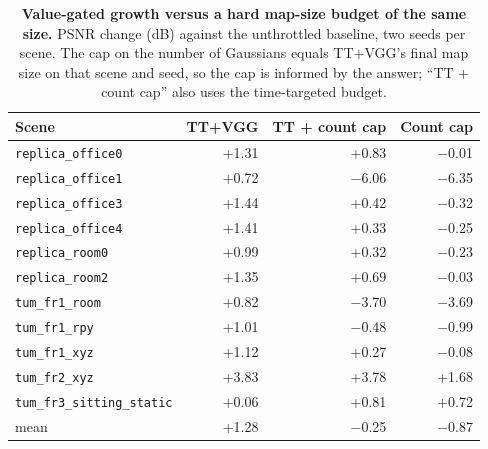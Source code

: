 \begin{table}[tbp]
\centering
\footnotesize\setlength{\tabcolsep}{4pt}
\begin{tabular}{lrrr}
\toprule
\textbf{Scene} & \textbf{TT+VGG} & \textbf{TT + count cap} & \textbf{Count cap} \\
\midrule
\texttt{replica\_office0} & +1.31 & +0.83 & $-$0.01 \\
\texttt{replica\_office1} & +0.72 & $-$6.06 & $-$6.35 \\
\texttt{replica\_office3} & +1.44 & +0.42 & $-$0.32 \\
\texttt{replica\_office4} & +1.41 & +0.33 & $-$0.25 \\
\texttt{replica\_room0} & +0.99 & +0.32 & $-$0.23 \\
\texttt{replica\_room2} & +1.35 & +0.69 & $-$0.03 \\
\texttt{tum\_fr1\_room} & +0.82 & $-$3.70 & $-$3.69 \\
\texttt{tum\_fr1\_rpy} & +1.01 & $-$0.48 & $-$0.99 \\
\texttt{tum\_fr1\_xyz} & +1.12 & +0.27 & $-$0.08 \\
\texttt{tum\_fr2\_xyz} & +3.83 & +3.78 & +1.68 \\
\texttt{tum\_fr3\_sitting\_static} & +0.06 & +0.81 & +0.72 \\
\midrule
mean & +1.28 & $-$0.25 & $-$0.87 \\
\bottomrule
\end{tabular}
\caption{\textbf{Value-gated growth versus a hard map-size budget of the same size.} PSNR change (dB) against the unthrottled baseline, two seeds per scene. The cap on the number of Gaussians equals TT+VGG's final map size on that scene and seed, so the cap is informed by the answer; ``TT + count cap'' also uses the time-targeted budget.}
\label{tab:countcap}
\end{table}
